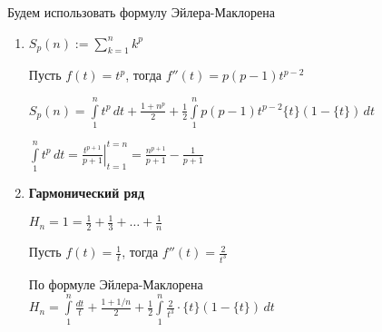 Будем использовать формулу Эйлера-Маклорена
\begin{example} \thmslashn
\begin{enumerate}
    \item $S_p(n) := \sum\limits_{k=1}^{n} k^p$

    Пусть $f(t) = t^p$, тогда $f''(t) = p(p-1)t^{p-2}$
        
    $S_p(n) = \int\limits_{1}^{n} t^p\,dt + \frac{1+n^p}{2} + \frac{1}{2} \int\limits_{1}^{n} p(p-1)t^{p-2} \{t\} (1-\{t\})\,dt $
    
    $\int\limits_{1}^{n} t^p\,dt = \left. \frac{t^{p+1}}{p+1} \right|_{t = 1}^{t = n} = \frac{n^{p+1}}{p+1} - \frac{1}{p+1}$
    

    \item \textbf{Гармонический ряд}
    
    $H_n = 1 = \frac{1}{2} + \frac{1}{3} + \ldots + \frac{1}{n}$
    
    Пусть $f(t) = \frac{1}{t}$, тогда $f''(t) = \frac{2}{t^3}$
    
    По формуле Эйлера-Маклорена\\
    $H_n = \int\limits_{1}^{n} \frac{dt}{t} + \frac{1 + 1/n}{2} + \frac{1}{2} \int\limits_{1}^{n} \frac{2}{t^3} \cdot \{t\}(1 - \{t\})\, dt$
    

\end{enumerate}
\end{example}

